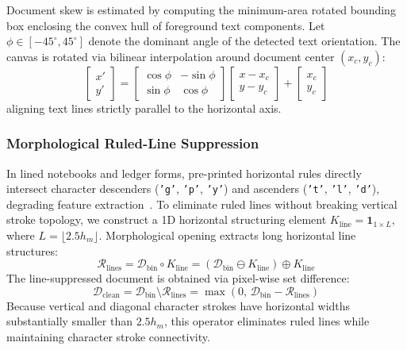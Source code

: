 \documentclass{IEEEtran}
\begin{document}
Document skew is estimated by computing the minimum-area rotated bounding box enclosing the convex hull of foreground text components. Let $\phi \in [-45^\circ, 45^\circ]$ denote the dominant angle of the detected text orientation. The canvas is rotated via bilinear interpolation around document center $(x_c, y_c)$:
\begin{equation}
\begin{bmatrix} x' \\ y' \end{bmatrix} = \begin{bmatrix} \cos\phi & -\sin\phi \\ \sin\phi & \cos\phi \end{bmatrix} \begin{bmatrix} x - x_c \\ y - y_c \end{bmatrix} + \begin{bmatrix} x_c \\ y_c \end{bmatrix}
\end{equation}
aligning text lines strictly parallel to the horizontal axis.

\subsubsection{Morphological Ruled-Line Suppression}

In lined notebooks and ledger forms, pre-printed horizontal rules directly intersect character descenders (\texttt{'g'}, \texttt{'p'}, \texttt{'y'}) and ascenders (\texttt{'t'}, \texttt{'l'}, \texttt{'d'}), degrading feature extraction~\cite{zheng2013}. To eliminate ruled lines without breaking vertical stroke topology, we construct a 1D horizontal structuring element $K_{\text{line}} = \mathbf{1}_{1 \times L}$, where $L = \lfloor 2.5 h_m \rfloor$. Morphological opening extracts long horizontal line structures:
\begin{equation}
\mathcal{R}_{\text{lines}} = \mathcal{D}_{\text{bin}} \circ K_{\text{line}} = (\mathcal{D}_{\text{bin}} \ominus K_{\text{line}}) \oplus K_{\text{line}}
\end{equation}
\noindent The line-suppressed document is obtained via pixel-wise set difference:
\begin{equation}
\mathcal{D}_{\text{clean}} = \mathcal{D}_{\text{bin}} \setminus \mathcal{R}_{\text{lines}} = \max\left(0, \, \mathcal{D}_{\text{bin}} - \mathcal{R}_{\text{lines}}\right)
\label{eq:line_suppression}
\end{equation}
\noindent Because vertical and diagonal character strokes have horizontal widths substantially smaller than $2.5 h_m$, this operator eliminates ruled lines while maintaining character stroke connectivity.
\end{document}
